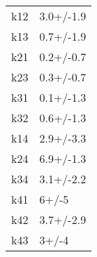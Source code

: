 \begin{tabular}{ll}
\toprule
k12 &  3.0+/-1.9 \\
k13 &  0.7+/-1.9 \\
k21 &  0.2+/-0.7 \\
k23 &  0.3+/-0.7 \\
k31 &  0.1+/-1.3 \\
k32 &  0.6+/-1.3 \\
k14 &  2.9+/-3.3 \\
k24 &  6.9+/-1.3 \\
k34 &  3.1+/-2.2 \\
k41 &      6+/-5 \\
k42 &  3.7+/-2.9 \\
k43 &      3+/-4 \\
\bottomrule
\end{tabular}
